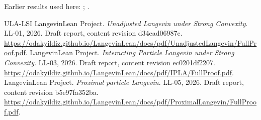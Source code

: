 \documentclass[11pt,a4paper]{article}
\begin{document}
Earlier results used here: \cite[Section~3.13.2]{LangevinLean2026ULASC}; \cite[Section~3.13.5]{LangevinLean2026ULASC}.

\begin{thebibliography}{ULA-LSI}
LangevinLean Project. \emph{Unadjusted Langevin under Strong Convexity}. LL-01, 2026. Draft report, content revision d34ead06987c. \url{https://odakyildiz.github.io/LangevinLean/docs/pdf/UnadjustedLangevin/FullProof.pdf}.
LangevinLean Project. \emph{Interacting Particle Langevin under Strong Convexity}. LL-03, 2026. Draft report, content revision ec0201df2207. \url{https://odakyildiz.github.io/LangevinLean/docs/pdf/IPLA/FullProof.pdf}.
LangevinLean Project. \emph{Proximal particle Langevin}. LL-05, 2026. Draft report, content revision b5e97fa352ba. \url{https://odakyildiz.github.io/LangevinLean/docs/pdf/ProximalLangevin/FullProof.pdf}.
\end{thebibliography}
\end{document}

